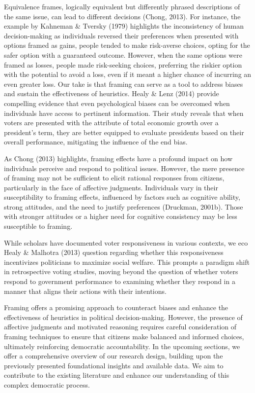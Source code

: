 \documentclass[
]{article}
\begin{document}
Equivalence frames, logically equivalent but differently phrased
descriptions of the same issue, can lead to different decisions (Chong,
2013). For instance, the example by Kahneman \& Tversky (1979)
highlights the inconsistency of human decision-making as individuals
reversed their preferences when presented with options framed as gains,
people tended to make risk-averse choices, opting for the safer option
with a guaranteed outcome. However, when the same options were framed as
losses, people made risk-seeking choices, preferring the riskier option
with the potential to avoid a loss, even if it meant a higher chance of
incurring an even greater loss. Our take is that framing can serve as a
tool to address biases and sustain the effectiveness of heuristics.
Healy \& Lenz (2014) provide compelling evidence that even psychological
biases can be overcomed when individuals have access to pertinent
information. Their study reveals that when voters are presented with the
attribute of total economic growth over a president's term, they are
better equipped to evaluate presidents based on their overall
performance, mitigating the influence of the end bias.

As Chong (2013) highlights, framing effects have a profound impact on
how individuals perceive and respond to political issues. However, the
mere presence of framing may not be sufficient to elicit rational
responses from citizens, particularly in the face of affective
judgments. Individuals vary in their susceptibility to framing effects,
influenced by factors such as cognitive ability, strong attitudes, and
the need to justify preferences (Druckman, 2001b). Those with stronger
attitudes or a higher need for cognitive consistency may be less
susceptible to framing.

While scholars have documented voter responsiveness in various contexts,
we eco Healy \& Malhotra (2013) question regarding whether this
responsiveness incentivizes politicians to maximize social welfare. This
prompts a paradigm shift in retrospective voting studies, moving beyond
the question of whether voters respond to government performance to
examining whether they respond in a manner that aligns their actions
with their intentions.

Framing offers a promising approach to counteract biases and enhance the
effectiveness of heuristics in political decision-making. However, the
presence of affective judgments and motivated reasoning requires careful
consideration of framing techniques to ensure that citizens make
balanced and informed choices, ultimately reinforcing democratic
accountability. In the upcoming sections, we offer a comprehensive
overview of our research design, building upon the previously presented
foundational insights and available data. We aim to contribute to the
existing literature and enhance our understanding of this complex
democratic process.
\end{document}
